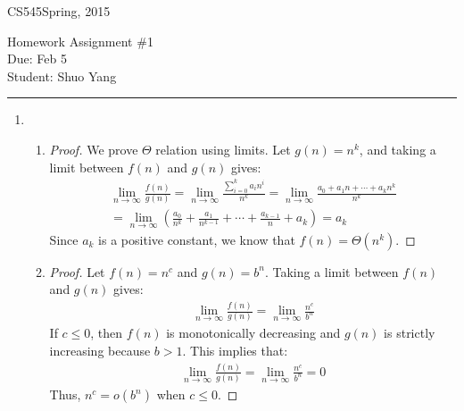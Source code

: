 \documentclass[11pt]{article}
\def\CourseCode{CS545}
\def\AssignmentNo{1}
\def\DateHandedOut{Spring, 2015}
\def\DateDue{Feb 5}
\def\Author{Shuo Yang}
\begin{document}
\noindent

\CourseCode \hfill \DateHandedOut

\begin{center}
Homework Assignment \#\AssignmentNo\\
Due: \DateDue\\
Student: \Author\\
\end{center}

\hrule\smallskip

\begin{enumerate}

\item %
\begin{enumerate} %
\item \begin{proof}
  We prove $\Theta$ relation using limits. Let $g(n)=n^k$, and taking a
  limit between $f(n)$ and $g(n)$ gives:
  \begin{align}
    \lim_{n\to\infty} \frac{f(n)}{g(n)} = \lim_{n\to\infty}
    \frac{\sum_{i=0}^{k} a_in^i}{n^k} = \lim_{n\to\infty}
    \frac{a_0+a_1n+\cdots+a_kn^k}{n^k} \\= \lim_{n\to\infty}
    (\frac{a_0}{n^k} + \frac{a_1}{n^{k-1}} + \cdots +
    \frac{a_{k-1}}{n} + a_k) = a_k
  \end{align}
  Since $a_k$ is a positive constant, we know that $f(n) = \Theta(n^k)$.
\end{proof}

\item \begin{proof}
  Let $f(n) = n^c$ and $g(n) = b^n$. Taking a limit between $f(n)$ and
  $g(n)$ gives: 
  \begin{align}
    \lim_{n\to\infty} \frac{f(n)}{g(n)} = \lim_{n\to\infty}
    \frac{n^c}{b^n}
  \end{align}
  If $c \leq 0$, then $f(n)$ is monotonically decreasing and $g(n)$ is
  strictly increasing because $b>1$. This implies that:
  \begin{align}
    \lim_{n\to\infty} \frac{f(n)}{g(n)} = \lim_{n\to\infty}
    \frac{n^c}{b^n} = 0
  \end{align}
  Thus, $n^c = o(b^n)$ when $c \leq 0$.


\end{proof}
\end{enumerate}
\end{enumerate}
\end{document}
